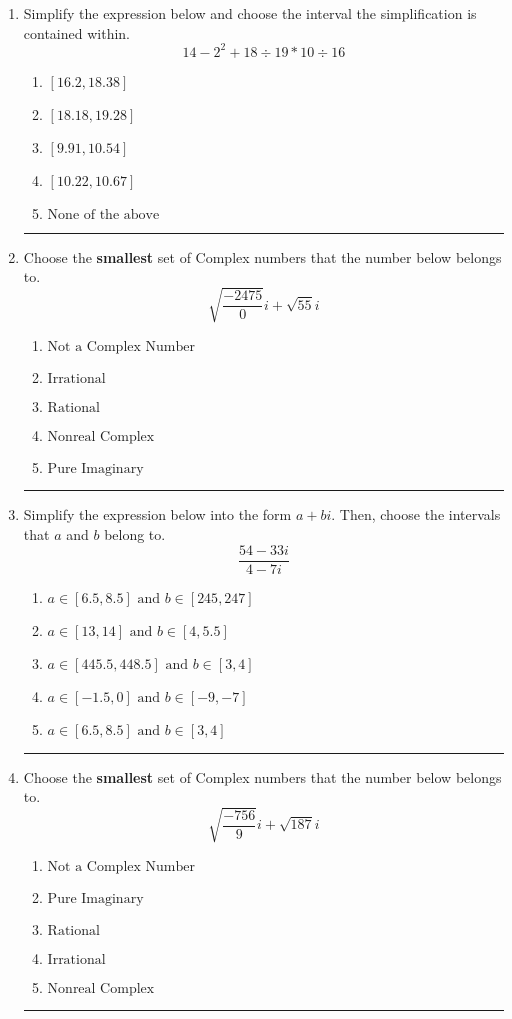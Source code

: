\documentclass[14pt]{extbook}
\newcommand{\litem}[1]{\item#1\hspace*{-1cm}\rule{\textwidth}{0.4pt}}
\begin{document}
\begin{enumerate}
\litem{
Simplify the expression below and choose the interval the simplification is contained within.\[ 14 - 2^2 + 18 \div 19 * 10 \div 16 \]\begin{enumerate}[label=\Alph*.]
\item \( [16.2, 18.38] \)
\item \( [18.18, 19.28] \)
\item \( [9.91, 10.54] \)
\item \( [10.22, 10.67] \)
\item \( \text{None of the above} \)

\end{enumerate} }
\litem{
Choose the \textbf{smallest} set of Complex numbers that the number below belongs to.\[ \sqrt{\frac{-2475}{0}} i+\sqrt{55}i \]\begin{enumerate}[label=\Alph*.]
\item \( \text{Not a Complex Number} \)
\item \( \text{Irrational} \)
\item \( \text{Rational} \)
\item \( \text{Nonreal Complex} \)
\item \( \text{Pure Imaginary} \)

\end{enumerate} }
\litem{
Simplify the expression below into the form $a+bi$. Then, choose the intervals that $a$ and $b$ belong to.\[ \frac{54 - 33 i}{4 - 7 i} \]\begin{enumerate}[label=\Alph*.]
\item \( a \in [6.5, 8.5] \text{ and } b \in [245, 247] \)
\item \( a \in [13, 14] \text{ and } b \in [4, 5.5] \)
\item \( a \in [445.5, 448.5] \text{ and } b \in [3, 4] \)
\item \( a \in [-1.5, 0] \text{ and } b \in [-9, -7] \)
\item \( a \in [6.5, 8.5] \text{ and } b \in [3, 4] \)

\end{enumerate} }
\litem{
Choose the \textbf{smallest} set of Complex numbers that the number below belongs to.\[ \sqrt{\frac{-756}{9}} i+\sqrt{187}i \]\begin{enumerate}[label=\Alph*.]
\item \( \text{Not a Complex Number} \)
\item \( \text{Pure Imaginary} \)
\item \( \text{Rational} \)
\item \( \text{Irrational} \)
\item \( \text{Nonreal Complex} \)


\end{enumerate}}
\end{enumerate}
\end{document}
